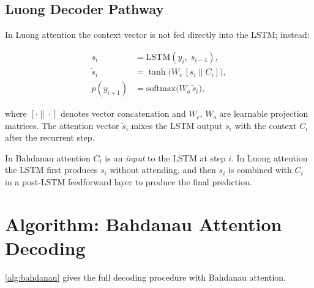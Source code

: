 \documentclass[12pt,a4paper]{article}
\begin{document}
\subsection{Luong Decoder Pathway}

In Luong attention the context vector is not fed directly into the
LSTM; instead:

\begin{align}
  s_i        &= \mathrm{LSTM}(y_i,\; s_{i-1}),              \label{eq:luong-lstm} \\
  \tilde{s}_i &= \tanh\!\bigl(W_c \,[s_i \| C_i]\bigr),     \label{eq:luong-tilde} \\
  p(y_{i+1}) &= \mathrm{softmax}\!\bigl(W_o \,\tilde{s}_i\bigr), \label{eq:luong-out}
\end{align}

where $[\cdot \| \cdot]$ denotes vector concatenation and
$W_c$, $W_o$ are learnable projection matrices.  The attention
vector $\tilde{s}_i$ mixes the LSTM output $s_i$ with the
context $C_i$ after the recurrent step.

\begin{keyinsight}[title=Key Architectural Difference]
  In Bahdanau attention $C_i$ is an \emph{input} to the LSTM at step
  $i$.  In Luong attention the LSTM first produces $s_i$ without
  attending, and then $s_i$ is combined with $C_i$ in a post-LSTM
  feedforward layer to produce the final prediction.
\end{keyinsight}

\section{Algorithm: Bahdanau Attention Decoding}
\label{sec:algorithm}

\cref{alg:bahdanau} gives the full decoding procedure with Bahdanau
attention.
\end{document}
